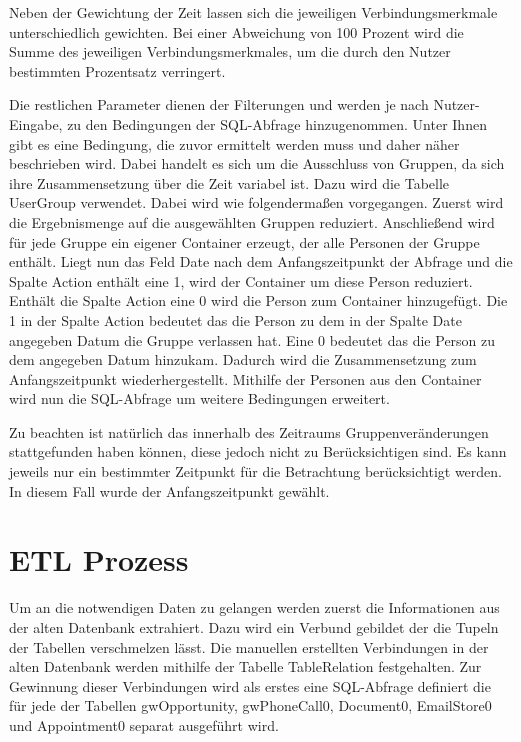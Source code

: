 Neben der Gewichtung der Zeit lassen sich die jeweiligen Verbindungsmerkmale unterschiedlich gewichten. Bei einer Abweichung von 100 Prozent wird die Summe des jeweiligen Verbindungsmerkmales, um die durch den Nutzer bestimmten Prozentsatz verringert. 

Die restlichen Parameter dienen der Filterungen und werden je nach Nutzer-Eingabe, zu den Bedingungen der SQL-Abfrage hinzugenommen. Unter Ihnen gibt es eine Bedingung, die zuvor ermittelt werden muss und daher näher beschrieben wird. Dabei handelt es sich um die Ausschluss von Gruppen, da sich ihre Zusammensetzung über die Zeit variabel ist. Dazu wird die Tabelle UserGroup verwendet. Dabei wird wie folgendermaßen vorgegangen. Zuerst wird die Ergebnismenge auf die ausgewählten Gruppen reduziert. Anschließend wird für jede Gruppe ein eigener Container erzeugt, der alle Personen der Gruppe enthält. Liegt nun das Feld Date nach dem Anfangszeitpunkt der Abfrage und die Spalte Action enthält eine 1, wird der Container um diese Person reduziert. Enthält die Spalte Action eine 0 wird die Person zum Container hinzugefügt. Die 1 in der Spalte Action bedeutet das die Person zu dem in der Spalte Date angegeben Datum die Gruppe verlassen hat. Eine 0 bedeutet das die Person zu dem angegeben Datum hinzukam. Dadurch wird die Zusammensetzung zum Anfangszeitpunkt wiederhergestellt. Mithilfe der Personen aus den Container wird nun die SQL-Abfrage um weitere Bedingungen erweitert.

Zu beachten ist natürlich das innerhalb des Zeitraums Gruppenveränderungen stattgefunden haben können, diese jedoch nicht zu Berücksichtigen sind. Es kann jeweils nur ein bestimmter Zeitpunkt für die Betrachtung berücksichtigt werden. In diesem Fall wurde der Anfangszeitpunkt gewählt.

\section{ETL Prozess}

Um an die notwendigen Daten zu gelangen werden zuerst die Informationen aus der alten Datenbank extrahiert. Dazu wird ein Verbund gebildet der die Tupeln der Tabellen verschmelzen lässt. Die manuellen erstellten Verbindungen in der alten Datenbank werden mithilfe der Tabelle TableRelation festgehalten. Zur Gewinnung dieser Verbindungen wird als erstes eine SQL-Abfrage definiert die für jede der Tabellen gwOpportunity, gwPhoneCall0, Document0, EmailStore0 und Appointment0 separat ausgeführt wird. 

